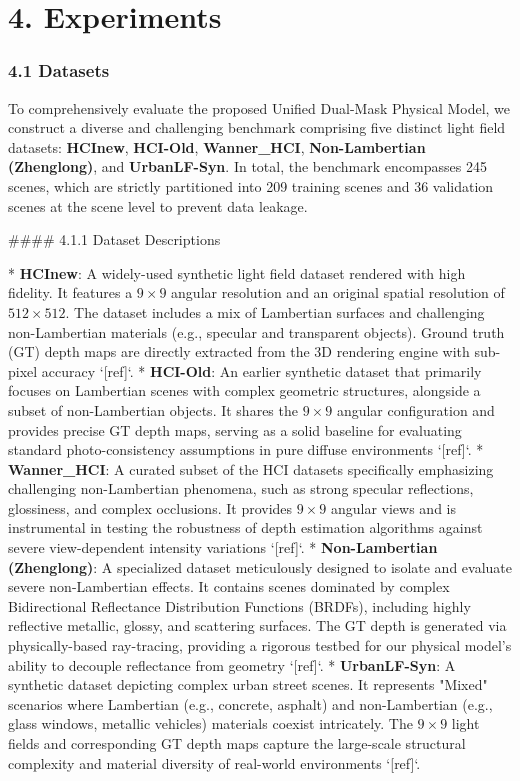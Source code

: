 \section{4. Experiments}

\subsubsection{4.1 Datasets}

To comprehensively evaluate the proposed Unified Dual-Mask Physical Model, we construct a diverse and challenging benchmark comprising five distinct light field datasets: \textbf{HCInew}, \textbf{HCI-Old}, \textbf{Wanner_HCI}, \textbf{Non-Lambertian (Zhenglong)}, and \textbf{UrbanLF-Syn}. In total, the benchmark encompasses 245 scenes, which are strictly partitioned into 209 training scenes and 36 validation scenes at the scene level to prevent data leakage. 

\#\#\#\# 4.1.1 Dataset Descriptions

*   \textbf{HCInew}: A widely-used synthetic light field dataset rendered with high fidelity. It features a \(9 \times 9\) angular resolution and an original spatial resolution of \(512 \times 512\). The dataset includes a mix of Lambertian surfaces and challenging non-Lambertian materials (e.g., specular and transparent objects). Ground truth (GT) depth maps are directly extracted from the 3D rendering engine with sub-pixel accuracy `[ref]`.
*   \textbf{HCI-Old}: An earlier synthetic dataset that primarily focuses on Lambertian scenes with complex geometric structures, alongside a subset of non-Lambertian objects. It shares the \(9 \times 9\) angular configuration and provides precise GT depth maps, serving as a solid baseline for evaluating standard photo-consistency assumptions in pure diffuse environments `[ref]`.
*   \textbf{Wanner_HCI}: A curated subset of the HCI datasets specifically emphasizing challenging non-Lambertian phenomena, such as strong specular reflections, glossiness, and complex occlusions. It provides \(9 \times 9\) angular views and is instrumental in testing the robustness of depth estimation algorithms against severe view-dependent intensity variations `[ref]`.
*   \textbf{Non-Lambertian (Zhenglong)}: A specialized dataset meticulously designed to isolate and evaluate severe non-Lambertian effects. It contains scenes dominated by complex Bidirectional Reflectance Distribution Functions (BRDFs), including highly reflective metallic, glossy, and scattering surfaces. The GT depth is generated via physically-based ray-tracing, providing a rigorous testbed for our physical model's ability to decouple reflectance from geometry `[ref]`.
*   \textbf{UrbanLF-Syn}: A synthetic dataset depicting complex urban street scenes. It represents "Mixed" scenarios where Lambertian (e.g., concrete, asphalt) and non-Lambertian (e.g., glass windows, metallic vehicles) materials coexist intricately. The \(9 \times 9\) light fields and corresponding GT depth maps capture the large-scale structural complexity and material diversity of real-world environments `[ref]`.

